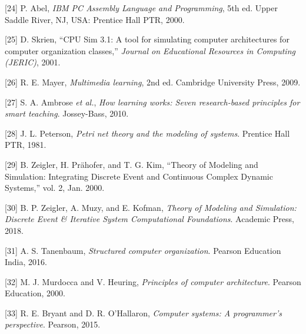 \documentclass[12pt,oneside]{templates/unerthesis}
\newcommand{\CSLLeftMargin}[1]{#1} %
\newcommand{\CSLRightInline}[1]{#1} %
\newlength{\cslhangindent}
\newenvironment{CSLReferences}[2] %
 {\setlength{\parindent}{0pt}%
  \setlength{\leftskip}{#1 pt\relax}%
  \setlength{\parskip}{#2 pt\relax}%
  \everypar{\setlength{\hangindent}{\cslhangindent}}}
 {\par}
\begin{document}
\begin{CSLReferences}{0}{0}
\leavevmode{}%
\CSLLeftMargin{{[}24{]} }%
\CSLRightInline{P. Abel, \emph{{IBM} {PC} {Assembly} {Language} and {Programming}}, 5th ed. Upper Saddle River, NJ, USA: Prentice Hall PTR, 2000.}

\leavevmode{}%
\CSLLeftMargin{{[}25{]} }%
\CSLRightInline{D. Skrien, {``{CPU} {Sim} 3.1: {A} tool for simulating computer architectures for computer organization classes,''} \emph{Journal on Educational Resources in Computing (JERIC)}, 2001.}

\leavevmode{}%
\CSLLeftMargin{{[}26{]} }%
\CSLRightInline{R. E. Mayer, \emph{Multimedia learning}, 2nd ed. Cambridge University Press, 2009.}

\leavevmode{}%
\CSLLeftMargin{{[}27{]} }%
\CSLRightInline{S. A. Ambrose \emph{et al.}, \emph{How learning works: Seven research-based principles for smart teaching}. Jossey-Bass, 2010.}

\leavevmode{}%
\CSLLeftMargin{{[}28{]} }%
\CSLRightInline{J. L. Peterson, \emph{Petri net theory and the modeling of systems}. Prentice Hall PTR, 1981.}

\leavevmode{}%
\CSLLeftMargin{{[}29{]} }%
\CSLRightInline{B. Zeigler, H. Prähofer, and T. G. Kim, {``Theory of {Modeling} and {Simulation}: {Integrating} {Discrete} {Event} and {Continuous} {Complex} {Dynamic} {Systems},''} vol. 2, Jan. 2000.}

\leavevmode{}%
\CSLLeftMargin{{[}30{]} }%
\CSLRightInline{B. P. Zeigler, A. Muzy, and E. Kofman, \emph{Theory of {Modeling} and {Simulation}: {Discrete} {Event} \& {Iterative} {System} {Computational} {Foundations}}. Academic Press, 2018.}

\leavevmode{}%
\CSLLeftMargin{{[}31{]} }%
\CSLRightInline{A. S. Tanenbaum, \emph{Structured computer organization}. Pearson Education India, 2016.}

\leavevmode{}%
\CSLLeftMargin{{[}32{]} }%
\CSLRightInline{M. J. Murdocca and V. Heuring, \emph{Principles of computer architecture}. Pearson Education, 2000.}

\leavevmode{}%
\CSLLeftMargin{{[}33{]} }%
\CSLRightInline{R. E. Bryant and D. R. O'Hallaron, \emph{Computer systems: A programmer's perspective}. Pearson, 2015.}


\end{CSLReferences}
\end{document}

